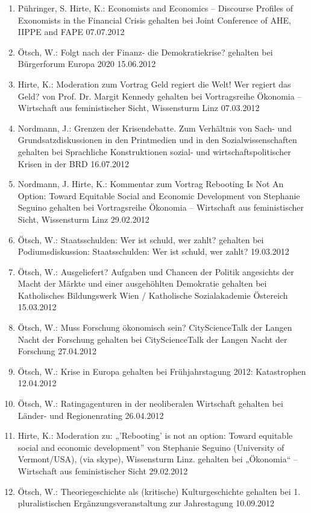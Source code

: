 \begin{enumerate}
	\item Pühringer, S. Hirte, K.: Economists and Economics -- Discourse Profiles of Exonomists in the Financial Crisis gehalten bei Joint Conference of AHE, IIPPE and FAPE 07.07.2012
	\item Ötsch, W.: Folgt nach der Finanz- die Demokratiekrise? gehalten bei Bürgerforum Europa 2020 15.06.2012
	\item Hirte, K.: Moderation zum Vortrag \glqq Geld regiert die Welt! Wer regiert das Geld?\grqq{} von Prof. Dr. Margit Kennedy gehalten bei Vortragsreihe Ökonomia -- Wirtschaft aus feministischer Sicht, Wissensturm Linz 07.03.2012
	\item Nordmann, J.: Grenzen der Krisendebatte. Zum Verhältnis von Sach- und Grundsatzdiskussionen in den Printmedien und in den Sozialwissenschaften gehalten bei Sprachliche Konstruktionen sozial- und wirtschaftspolitischer \glqq Krisen\grqq{} in der BRD 16.07.2012
	\item Nordmann, J. Hirte, K.: Kommentar zum Vortrag \glqq Rebooting Is Not An Option: Toward Equitable Social and Economic Development\grqq{} von Stephanie Seguino gehalten bei Vortragsreihe Ökonomia -- Wirtschaft aus feministischer Sicht, Wissensturm Linz 29.02.2012
	\item Ötsch, W.: Staatsschulden: Wer ist schuld, wer zahlt? gehalten bei Podiumsdiskussion: \glqq Staatsschulden: Wer ist schuld, wer zahlt?\grqq{} 19.03.2012
	\item Ötsch, W.: Ausgeliefert? Aufgaben und Chancen der Politik angesichts der \glqq Macht der Märkte\grqq{} und einer ausgehöhlten Demokratie gehalten bei Katholisches Bildungswerk Wien / Katholische Sozialakademie Östereich 15.03.2012
	\item Ötsch, W.: Muss Forschung ökonomisch sein? CityScienceTalk der Langen Nacht der Forschung gehalten bei CityScienceTalk der Langen Nacht der Forschung 27.04.2012
	\item Ötsch, W.: Krise in Europa gehalten bei Frühjahrstagung 2012: Katastrophen 12.04.2012
	\item Ötsch, W.: Ratingagenturen in der neoliberalen Wirtschaft gehalten bei Länder- und Regionenrating 26.04.2012
	\item Hirte, K.: Moderation zu: „’Rebooting’ is not an option: Toward equitable social and economic development” von Stephanie Seguino (University of Vermont/USA), (via skype), Wissensturm Linz. gehalten bei „Ökonomia“ -- Wirtschaft aus feministischer Sicht 29.02.2012
	\item Ötsch, W.: Theoriegeschichte als (kritische) Kulturgeschichte gehalten bei 1. pluralistischen Ergänzungsveranstaltung zur Jahrestagung 10.09.2012

\end{enumerate}
